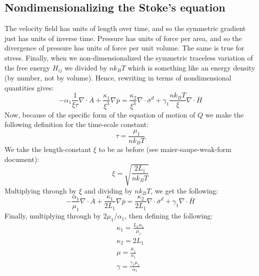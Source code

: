 \documentclass[reqno]{article}
\begin{document}
  \subsection{Nondimensionalizing the Stoke's equation}
  The velocity field has units of length over time, and so the symmetric
  gradient just has units of inverse time.
  Pressure has units of force per area, and so the divergence of pressure has
  units of force per unit volume.
  The same is true for stress.
  Finally, when we non-dimensionalized the symmetric traceless variation of the
  free energy $H_{ij}$ we divided by $n k_B T$ which is something like an energy
  density (by number, not by volume).
  Hence, rewriting in terms of nondimensional quantities gives:
  \begin{equation}
    -\alpha_1 \frac{1}{\xi \tau} \nabla \cdot \overline{A}
    + \frac{\kappa_1}{\xi^3} \nabla \overline{p}
    =
    \frac{\kappa_2}{\xi^3} \nabla \cdot \overline{\sigma}^d
    + \gamma_1 \frac{n k_B T}{\xi} \nabla \cdot \overline{H}
  \end{equation}
  Now, because of the specific form of the equation of motion of $Q$ we make the
  following definition for the time-scale constant:
  \begin{equation}
    \tau
    =
    \frac{\mu_1}{n k_B T}
  \end{equation}
  We take the length-constant $\xi$ to be as before (see maier-saupe-weak-form
  document):
  \begin{equation}
    \xi
    =
    \sqrt{\frac{2 L_1}{n k_B T}}
  \end{equation}
  Multiplying through by $\xi$ and dividing by $n k_B T$, we get the following:
  \begin{equation}
    - \frac{\alpha_1}{\mu_1} \nabla \cdot \overline{A}
    + \frac{\kappa_1}{2 L_1} \nabla \overline{p}
    =
    \frac{\kappa_2}{2 L_1} \nabla \cdot \overline{\sigma}^d
    + \gamma_1 \nabla \cdot \overline{H}
  \end{equation}
  Finally, multiplying through by $2 \mu_1 / \alpha_1$, then defining the
  following:
  \begin{equation}
    \begin{split}
      \kappa_1 = \frac{L_1 \alpha_1}{\mu_1} \\
      \kappa_2 = 2 L_1 \\
      \mu = \frac{\mu_1}{\alpha_1} \\
      \gamma = \frac{\gamma_1 \mu_1}{\alpha_1}
    \end{split}
  \end{equation}
\end{document}
